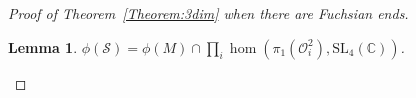 \documentclass[a4paper,11pt]{article}
\newtheorem{Lemma}[Theorem]{Lemma}
\begin{document}
\begin{proof}[Proof of Theorem~\ref{Theorem:3dim}
 when there are Fuchsian ends]
\begin{Lemma}
  $\phi(\mathcal S)=\phi(M)\cap \prod_i \hom(\pi_1(\mathcal O^2_i),\mathrm{SL}_4(\mathbb C))$.
\end{Lemma}





% 
% 



\end{proof}
\end{document}

